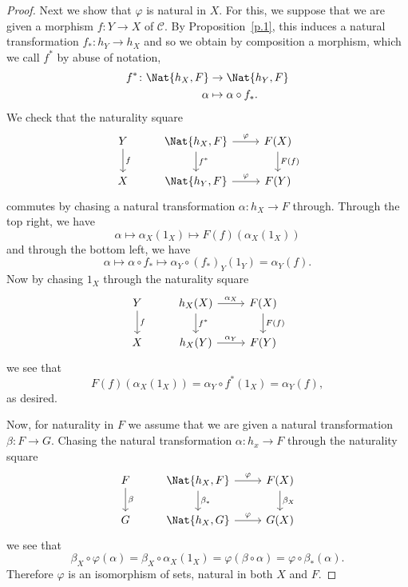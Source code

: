 \documentclass[10pt]{amsart}
\begin{document}
\begin{lem}[Yoneda]
\begin{proof}
    Next we show that $\varphi$ is natural in $X$.
    For this, we suppose that we are given a morphism $f : Y \rightarrow X$ of $\mathscr{C}$.
    By Proposition~\ref{p.1}, this induces a natural transformation $f_* : h_Y \rightarrow h_X$ and so we obtain by composition a morphism, which we call $f^*$ by abuse of notation,
    \begin{align*}
      f^* \colon \Nat{h_X, F} &\rightarrow \Nat{h_Y,F}\\
      \alpha & \mapsto \alpha \circ f_*.
    \end{align*}
    We check that the naturality square
    $$\begin{tikzcd}
      Y\arrow{d}{f} & \Nat{h_X, F}\arrow{r}{\varphi}\arrow{d}{f^*} & F(X)\arrow{d}{F(f)}\\
      X & \Nat{h_Y, F}\arrow{r}{\varphi} & F(Y)
    \end{tikzcd}$$
    commutes by chasing a natural transformation $\alpha : h_X \rightarrow F$ through.
    Through the top right, we have
    $$\alpha \mapsto \alpha_X(1_X) \mapsto F(f)(\alpha_X(1_X))$$
    and through the bottom left, we have
    $$\alpha \mapsto \alpha \circ f_* \mapsto \alpha_Y \circ (f_*)_Y (1_Y) = \alpha_Y(f).$$
    Now by chasing $1_X$ through the naturality square
    $$\begin{tikzcd}
      Y\arrow{d}{f} & h_X(X)\arrow{r}{\alpha_X}\arrow{d}{f^*} & F(X)\arrow{d}{F(f)}\\
      X & h_X(Y)\arrow{r}{\alpha_Y} & F(Y)
    \end{tikzcd}$$
    we see that
    $$F(f)(\alpha_X(1_X)) = \alpha_Y \circ f^* (1_X) = \alpha_Y(f),$$
    as desired.

    Now, for naturality in $F$ we assume that we are given a natural transformation $\beta : F \rightarrow G$.
    Chasing the natural transformation $\alpha : h_x \rightarrow F$ through the naturality square
    $$\begin{tikzcd}
      F\arrow{d}{\beta} & \Nat{h_X, F} \arrow{r}{\varphi}\arrow{d}{\beta_*} & F(X)\arrow{d}{\beta_X} \\
      G & \Nat{h_X, G} \arrow{r}{\varphi} & G(X)
    \end{tikzcd}$$
    we see that
    $$\beta_X \circ \varphi(\alpha) = \beta_X \circ \alpha_X(1_X) = \varphi( \beta \circ \alpha) = \varphi \circ \beta_* ( \alpha).$$
    Therefore $\varphi$ is an isomorphism of sets, natural in both $X$ and $F$.
  \end{proof}
\end{lem}
\end{document}
